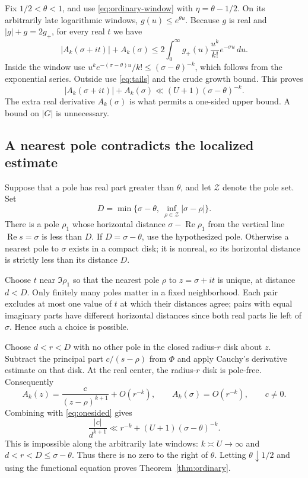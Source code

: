 \documentclass[11pt,a4paper]{article}
\numberwithin{equation}{section}
\theoremstyle{remark}\newtheorem{remark}[theorem]{Remark}
\newcommand{\Rea}{\operatorname{Re}}
\begin{document}
Fix $1/2<\theta<1$, and use \eqref{eq:ordinary-window} with $\eta=\theta-1/2$. On its arbitrarily late logarithmic windows, $g(u)\le e^{\theta u}$. Because $g$ is real and $|g|+g=2g_+$, for every real $t$ we have
\[
|A_k(\sigma+it)|+A_k(\sigma)
\le2\int_0^\infty g_+(u)\frac{u^k}{k!}e^{-\sigma u}\,du.
\]
Inside the window use $u^ke^{-(\sigma-\theta)u}/k!\le(\sigma-\theta)^{-k}$, which follows from the exponential series. Outside use \eqref{eq:tails} and the crude growth bound. This proves
\begin{equation}\label{eq:onesided}
|A_k(\sigma+it)|+A_k(\sigma)
       \ll(U+1)(\sigma-\theta)^{-k}.
\end{equation}
The extra real derivative $A_k(\sigma)$ is what permits a one-sided upper bound. A bound on $|G|$ is unnecessary.

\subsection{A nearest pole contradicts the localized estimate}

Suppose that a pole has real part greater than $\theta$, and let $\mathcal Z$ denote the pole set. Set
\[
D=\min\{\sigma-\theta,\ \inf_{\rho\in\mathcal Z}|\sigma-\rho|\}.
\]
There is a pole $\rho_1$ whose horizontal distance $\sigma-\Rea\rho_1$ from the vertical line $\Rea s=\sigma$ is less than $D$. If $D=\sigma-\theta$, use the hypothesized pole. Otherwise a nearest pole to $\sigma$ exists in a compact disk; it is nonreal, so its horizontal distance is strictly less than its distance $D$.

Choose $t$ near $\Im\rho_1$ so that the nearest pole $\rho$ to $z=\sigma+it$ is unique, at distance $d<D$. Only finitely many poles matter in a fixed neighborhood. Each pair excludes at most one value of $t$ at which their distances agree; pairs with equal imaginary parts have different horizontal distances since both real parts lie left of $\sigma$. Hence such a choice is possible.

Choose $d<r<D$ with no other pole in the closed radius-$r$ disk about $z$. Subtract the principal part $c/(s-\rho)$ from $\Phi$ and apply Cauchy's derivative estimate on that disk. At the real center, the radius-$r$ disk is pole-free. Consequently
\[
A_k(z)=\frac{c}{(z-\rho)^{k+1}}+O(r^{-k}),\qquad
A_k(\sigma)=O(r^{-k}),\qquad c\ne0.
\]
Combining with \eqref{eq:onesided} gives
\[
\frac{|c|}{d^{k+1}}\ll r^{-k}+(U+1)(\sigma-\theta)^{-k}.
\]
This is impossible along the arbitrarily late windows: $k\asymp U\to\infty$ and $d<r<D\le\sigma-\theta$. Thus there is no zero to the right of $\theta$. Letting $\theta\downarrow1/2$ and using the functional equation proves Theorem~\ref{thm:ordinary}.
\end{document}
